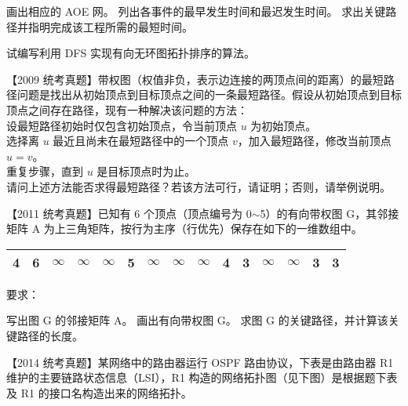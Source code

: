 \begin{qitems}
\begin{bbox}
\begin{center}
\begin{tabular}{|l|c|c|c|c|c|c|c|c|}
        \hline
        \end{tabular}
        \end{center}
        \begin{subqitems}
            \subqitem 画出相应的 AOE 网。
            \subqitem 列出各事件的最早发生时间和最迟发生时间。
            \subqitem 求出关键路径并指明完成该工程所需的最短时间。
        \end{subqitems}
    \end{bbox}
    \begin{bbox}
        \qitem 试编写利用 DFS 实现有向无环图拓扑排序的算法。
    \end{bbox}
    \begin{bbox}
        \qitem 【2009 统考真题】带权图（权值非负，表示边连接的两顶点间的距离）的最短路径问题是找出从初始顶点到目标顶点之间的一条最短路径。假设从初始顶点到目标顶点之间存在路径，现有一种解决该问题的方法：\\
         设最短路径初始时仅包含初始顶点，令当前顶点 $u$ 为初始顶点。\\
         选择离 $u$ 最近且尚未在最短路径中的一个顶点 $v$，加入最短路径，修改当前顶点 $u=v$。\\
         重复步骤，直到 $u$ 是目标顶点时为止。\\
        请问上述方法能否求得最短路径？若该方法可行，请证明；否则，请举例说明。
    \end{bbox}
    \begin{bbox}
        \qitem 【2011 统考真题】已知有 6 个顶点（顶点编号为 0$\sim$5）的有向带权图 G，其邻接矩阵 A 为上三角矩阵，按行为主序（行优先）保存在如下的一维数组中。
        \begin{center}
        \begin{tabular}{|c|c|c|c|c|c|c|c|c|c|c|c|c|c|c|}
        \hline
        4 & 6 & $\infty$ & $\infty$ & $\infty$ & 5 & $\infty$ & $\infty$ & $\infty$ & 4 & 3 & $\infty$ & $\infty$ & 3 & 3 \\
        \hline
        \end{tabular}
        \end{center}
        要求：
        \begin{subqitems}
            \subqitem 写出图 G 的邻接矩阵 A。
            \subqitem 画出有向带权图 G。
            \subqitem 求图 G 的关键路径，并计算该关键路径的长度。
        \end{subqitems}
    \end{bbox}
    \begin{bbox}
        \qitem 【2014 统考真题】某网络中的路由器运行 OSPF 路由协议，下表是由路由器 R1 维护的主要链路状态信息（LSI），R1 构造的网络拓扑图（见下图）是根据题下表及 R1 的接口名构造出来的网络拓扑。

\end{bbox}
\end{qitems}
